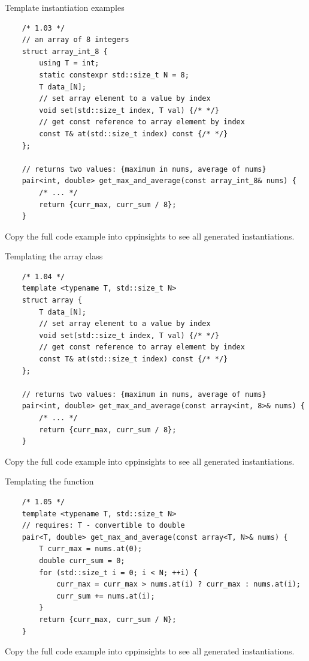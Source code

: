 \begin{frame}[fragile]{Template instantiation examples}
  \begin{verbatim}
    /* 1.03 */
    // an array of 8 integers
    struct array_int_8 {
        using T = int;
        static constexpr std::size_t N = 8;
        T data_[N];
        // set array element to a value by index
        void set(std::size_t index, T val) {/* */}
        // get const reference to array element by index
        const T& at(std::size_t index) const {/* */}
    };

    // returns two values: {maximum in nums, average of nums}
    pair<int, double> get_max_and_average(const array_int_8& nums) {
        /* ... */
        return {curr_max, curr_sum / 8};
    }
  \end{verbatim}

  Copy the full code example into cppinsights to see all generated instantiations.
\end{frame}

\begin{frame}[fragile]{Templating the array class}
  \begin{verbatim}
    /* 1.04 */
    template <typename T, std::size_t N>
    struct array {
        T data_[N];
        // set array element to a value by index
        void set(std::size_t index, T val) {/* */}
        // get const reference to array element by index
        const T& at(std::size_t index) const {/* */}
    };

    // returns two values: {maximum in nums, average of nums}
    pair<int, double> get_max_and_average(const array<int, 8>& nums) {
        /* ... */
        return {curr_max, curr_sum / 8};
    }
  \end{verbatim}

  Copy the full code example into cppinsights to see all generated instantiations.
\end{frame}

\begin{frame}[fragile]{Templating the function}
  \begin{verbatim}
    /* 1.05 */
    template <typename T, std::size_t N>
    // requires: T - convertible to double
    pair<T, double> get_max_and_average(const array<T, N>& nums) {
        T curr_max = nums.at(0);
        double curr_sum = 0;
        for (std::size_t i = 0; i < N; ++i) {
            curr_max = curr_max > nums.at(i) ? curr_max : nums.at(i);
            curr_sum += nums.at(i);
        }
        return {curr_max, curr_sum / N};
    }
  \end{verbatim}

  Copy the full code example into cppinsights to see all generated instantiations.
\end{frame}

